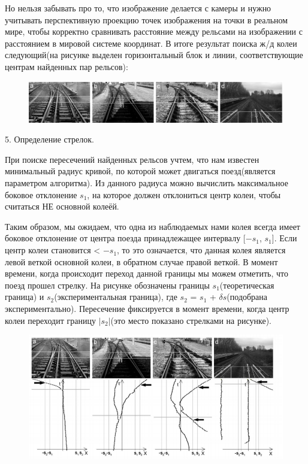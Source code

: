 Но нельзя забывать про то, что изображение делается с камеры и нужно учитывать перспективную проекцию \cite{b:projection} точек изображения на точки в реальном мире, чтобы корректно сравнивать расстояние между рельсами на изображении с расстоянием в мировой системе координат.
В итоге результат поиска ж/д колеи следующий(на рисунке выделен горизонтальный блок и линии, соответствующие центрам найденных пар рельсов):
\begin{figure}[!h]
	\centering
	\includegraphics[width=1\linewidth,height=0.5\linewidth]{pictures/screenshot006}
	\caption{}
	\label{fig:screenshot006}
\end{figure}

5. Определение стрелок.

При поиске пересечений найденных рельсов учтем, что нам известен минимальный радиус
кривой, по которой может двигаться поезд(является параметром алгоритма). Из данного радиуса можно вычислить максимальное боковое отклонение $s_1$, на которое должен отклониться центр колеи, чтобы считаться НЕ основной колеёй. 

Таким образом, мы ожидаем, что одна из наблюдаемых нами колея всегда имеет боковое отклонение от центра поезда принадлежащее интервалу [$-s_1$, $s_1$].
Если центр колеи становится < $-s_1$, то это означается, что данная колея является левой веткой основной колеи, в обратном случае правой веткой. В момент времени, когда
происходит переход данной границы мы можем отметить, что поезд прошел стрелку.
\newpage
На рисунке обозначены границы $s_1$(теоретическая граница) и $s_2$(экспериментальная граница), где $s_2$ = $s_1$ + $\delta s$(подобрана экспериментально). Пересечение фиксируется в момент времени, когда центр колеи переходит границу $|s_2|$(это место показано стрелками на рисунке).
\begin{figure}[!h]
	\centering
	\includegraphics[width=1\linewidth]{pictures/screenshot008}
	\caption{}
	\label{fig:screenshot008}
\end{figure}


